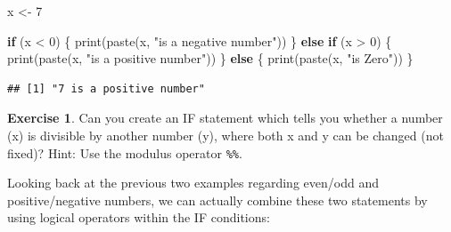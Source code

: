 \documentclass[
]{book}
\newenvironment{Shaded}{\begin{snugshade}}{\end{snugshade}}
\newcommand{\ControlFlowTok}[1]{\textcolor[rgb]{0.13,0.29,0.53}{\textbf{#1}}}
\newcommand{\DecValTok}[1]{\textcolor[rgb]{0.00,0.00,0.81}{#1}}
\newcommand{\FunctionTok}[1]{\textcolor[rgb]{0.00,0.00,0.00}{#1}}
\newcommand{\NormalTok}[1]{#1}
\newcommand{\OtherTok}[1]{\textcolor[rgb]{0.56,0.35,0.01}{#1}}
\newcommand{\SpecialCharTok}[1]{\textcolor[rgb]{0.00,0.00,0.00}{#1}}
\newcommand{\StringTok}[1]{\textcolor[rgb]{0.31,0.60,0.02}{#1}}
\theoremstyle{definition}
\theoremstyle{definition}
\theoremstyle{definition}
\newtheorem{exercise}{Exercise}[chapter]
\theoremstyle{definition}
\theoremstyle{remark}
\begin{document}
\begin{Shaded}
\begin{Highlighting}[]
\NormalTok{x }\OtherTok{\textless{}{-}} \DecValTok{7}

\ControlFlowTok{if}\NormalTok{ (x }\SpecialCharTok{\textless{}} \DecValTok{0}\NormalTok{) \{}
  \FunctionTok{print}\NormalTok{(}\FunctionTok{paste}\NormalTok{(x, }\StringTok{"is a negative number"}\NormalTok{))}
\NormalTok{\} }\ControlFlowTok{else} \ControlFlowTok{if}\NormalTok{ (x }\SpecialCharTok{\textgreater{}} \DecValTok{0}\NormalTok{) \{}
  \FunctionTok{print}\NormalTok{(}\FunctionTok{paste}\NormalTok{(x, }\StringTok{"is a positive number"}\NormalTok{))}
\NormalTok{\} }\ControlFlowTok{else}\NormalTok{ \{}
  \FunctionTok{print}\NormalTok{(}\FunctionTok{paste}\NormalTok{(x, }\StringTok{"is Zero"}\NormalTok{))}
\NormalTok{\}}
\end{Highlighting}
\end{Shaded}

\begin{verbatim}
## [1] "7 is a positive number"
\end{verbatim}

\begin{exercise}
Can you create an IF statement which tells you whether a number (x) is divisible by another number (y), where both x and y can be changed (not fixed)? Hint: Use the modulus operator \texttt{\%\%}.
\end{exercise}

Looking back at the previous two examples regarding even/odd and positive/negative numbers, we can actually combine these two statements by using logical operators within the IF conditions:
\end{document}
